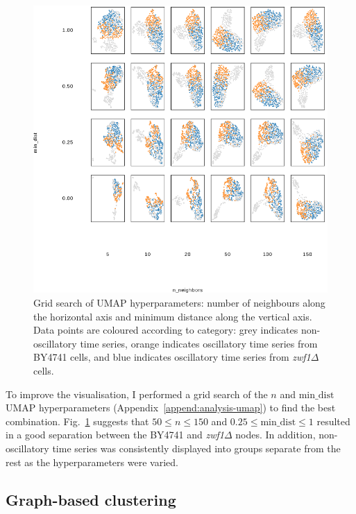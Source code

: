 \begin{figure}
  \centering
    \includegraphics[width=0.9\linewidth]{umap_grid_is20016_edit.png}
    \caption[
      Grid search of UMAP hyperparameters
    ]{
      Grid search of UMAP hyperparameters: number of neighbours along the horizontal axis and minimum distance along the vertical axis.
      Data points are coloured according to category: grey indicates non-oscillatory time series, orange indicates oscillatory time series from BY4741 cells, and blue indicates oscillatory time series from \textit{zwf1$\Delta$} cells.
    }
  \label{fig:umap-gridsearch}
\end{figure}

To improve the visualisation, I performed a grid search of the $n$ and $\mathrm{min\_dist}$ UMAP hyperparameters (Appendix~\ref{append:analysis-umap}) to find the best combination.
Fig.\ \ref{fig:umap-gridsearch} suggests that $50 \leq n \leq 150$ and $0.25 \leq \mathrm{min\_dist} \leq 1$ resulted in a good separation between the BY4741 and \textit{zwf1$\Delta$} nodes.
In addition, non-oscillatory time series was consistently displayed into groups separate from the rest as the hyperparameters were varied.


\subsection{Graph-based clustering}
\label{subsec:analysis-clustering-graphclustering}

